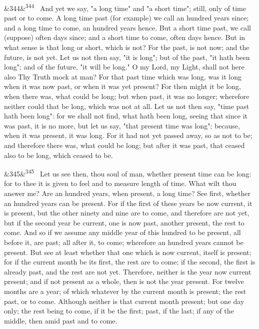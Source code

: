 \documentclass[12pt]{article}
\newcommand{\para}[1][]{\par\noindent\ifx&#1&\else\textsuperscript{\footnotesize #1}~\fi}
\begin{document}
\para[344] And yet we say, "a long time" and "a short time"; still, only of time past or to come. A long time past (for example) we call an hundred years since; and a long time to come, an hundred years hence. But a short time past, we call (suppose) often days since; and a short time to come, often days hence. But in what sense is that long or short, which is not? For the past, is not now; and the future, is not yet. Let us not then say, "it is long"; but of the past, "it hath been long"; and of the future, "it will be long." O my Lord, my Light, shall not here also Thy Truth mock at man? For that past time which was long, was it long when it was now past, or when it was yet present? For then might it be long, when there was, what could be long; but when past, it was no longer; wherefore neither could that be long, which was not at all. Let us not then say, "time past hath been long": for we shall not find, what hath been long, seeing that since it was past, it is no more, but let us say, "that present time was long"; because, when it was present, it was long. For it had not yet passed away, so as not to be; and therefore there was, what could be long; but after it was past, that ceased also to be long, which ceased to be.

\para[345] Let us see then, thou soul of man, whether present time can be long: for to thee it is given to feel and to measure length of time. What wilt thou answer me? Are an hundred years, when present, a long time? See first, whether an hundred years can be present. For if the first of these years be now current, it is present, but the other ninety and nine are to come, and therefore are not yet, but if the second year be current, one is now past, another present, the rest to come. And so if we assume any middle year of this hundred to be present, all before it, are past; all after it, to come; wherefore an hundred years cannot be present. But see at least whether that one which is now current, itself is present; for if the current month be its first, the rest are to come; if the second, the first is already past, and the rest are not yet. Therefore, neither is the year now current present; and if not present as a whole, then is not the year present. For twelve months are a year; of which whatever by the current month is present; the rest past, or to come. Although neither is that current month present; but one day only; the rest being to come, if it be the first; past, if the last; if any of the middle, then amid past and to come.
\end{document}
